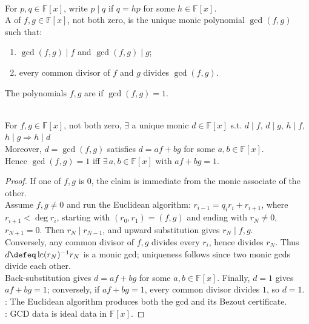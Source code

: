 \begin{definition} \label{def:polynomial-divisibility-gcd-coprime} \\
For $p,q\in\mathbb{F}[x]$, write $p\mid q$ if $q=hp$ for some $h\in\mathbb{F}[x]$.\\
A  of $f,g\in\mathbb{F}[x]$, not both zero, is the unique monic polynomial $\gcd(f,g)$ such that:
\begin{enumerate}[label=(\roman*)]
\setlength{\itemsep}{0pt}
\item $\gcd(f,g)\mid f$ and $\gcd(f,g)\mid g$;
\item every common divisor of $f$ and $g$ divides $\gcd(f,g)$.
\end{enumerate}
The polynomials $f,g$ are  if $\gcd(f,g)=1$.
\end{definition}

\begin{theorem} \label{thm:polynomial-gcd-bezout} \\
For $f,g\in\mathbb{F}[x]$, not both zero, $\exists$ a unique monic $d\in\mathbb{F}[x]$ s.t. $d\mid f$, $d\mid g$, $h\mid f$, $h\mid g\Longrightarrow h\mid d$\\
Moreover, $d=\gcd(f,g)$ satisfies $d=af+bg$ for some $a,b\in\mathbb{F}[x]$.\\
Hence $\gcd(f,g)=1$ iff $\exists\,a,b\in\mathbb{F}[x]$ with $af+bg=1$.
\begin{proof}
If one of $f,g$ is $0$, the claim is immediate from the monic associate of the other.\\
Assume $f,g\neq0$ and run the Euclidean algorithm: $r_{i-1}=q_ir_i+r_{i+1}$, where $r_{i+1}<\deg r_i$, starting with $(r_0,r_1)=(f,g)$ and ending with $r_N\neq0$, $r_{N+1}=0$. Then $r_N\mid r_{N-1}$, and upward substitution gives $r_N\mid f,g$.\\
Conversely, any common divisor of $f,g$ divides every $r_i$, hence divides $r_N$. Thus $d\defeq\operatorname{lc}(r_N)^{-1}r_N$ is a monic gcd; uniqueness follows since two monic gcds divide each other.\\
Back-substitution gives $d=af+bg$ for some $a,b\in\mathbb{F}[x]$. Finally, $d=1$ gives $af+bg=1$; conversely, if $af+bg=1$, every common divisor divides $1$, so $d=1$.\\
: The Euclidean algorithm produces both the gcd and its Bezout certificate.\\
: GCD data is ideal data in $\mathbb{F}[x]$.
\end{proof}
\end{theorem}

